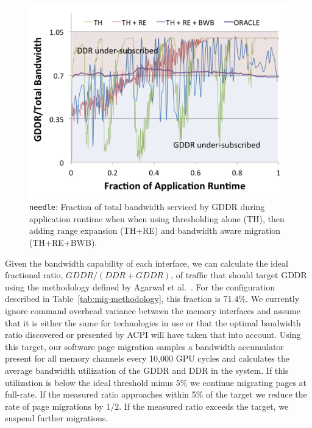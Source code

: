 \begin{figure}[t]
\centering
    \includegraphics[width=0.9\columnwidth]{hpca2015/figures/needle-bw-ratio.png}
    \caption{{\tt needle}: Fraction of total bandwidth serviced by GDDR during application
runtime when when using thresholding alone (TH), then adding range expansion
(TH+RE) and bandwidth aware migration (TH+RE+BWB).}
    \label{fig:migrationlimiting-needle}
\end{figure}

Given the bandwidth capability of each interface, we can calculate the ideal
fractional ratio, $GDDR / (DDR + GDDR)$, of traffic that should target GDDR
using the methodology defined by Agarwal et al.~\cite{Agarwal2015}.  For the
configuration described in Table~\ref{tab:mig-methodology}, this fraction is
71.4\%.  We currently ignore command overhead variance between the memory
interfaces and assume that it is either the same for technologies in use or that
the optimal bandwidth ratio discovered or presented by ACPI will have taken that
into account.  Using this target, our software page migration samples a
bandwidth accumulator present for all memory channels every 10,000 GPU cycles
and calculates the average bandwidth utilization of the GDDR and DDR in the
system.  If this utilization is below the ideal threshold minus 5\% we continue
migrating pages at full-rate.  If the measured ratio approaches within 5\% of
the target we reduce the rate of page migrations by 1/2.  If the measured ratio
exceeds the target, we suspend further migrations.

